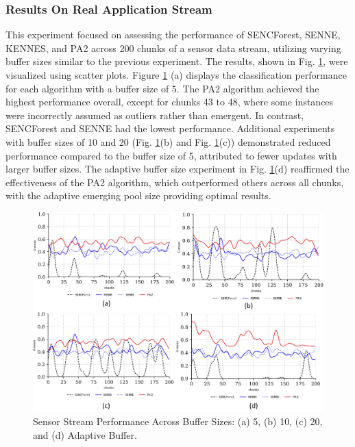 \subsubsection{Results On Real Application Stream}
\label{sec:sensor}
This experiment focused on assessing the performance of SENCForest, SENNE, KENNES, and PA2 across 200 chunks of a sensor data stream, utilizing varying buffer sizes similar to the previous experiment. The results, shown in Fig. \ref{fig:res2}, were visualized using scatter plots. Figure \ref{fig:res2} (a) displays the classification performance for each algorithm with a buffer size of 5. The PA2 algorithm achieved the highest performance overall, except for chunks 43 to 48, where some instances were incorrectly assumed as outliers rather than emergent. In contrast, SENCForest and SENNE had the lowest performance. Additional experiments with buffer sizes of 10 and 20 (Fig. \ref{fig:res2}(b) and Fig. \ref{fig:res2}(c)) demonstrated reduced performance compared to the buffer size of 5, attributed to fewer updates with larger buffer sizes. The adaptive buffer size experiment in Fig. \ref{fig:res2}(d) reaffirmed the effectiveness of the PA2 algorithm, which outperformed others across all chunks, with the adaptive emerging pool size providing optimal results.

\begin{figure}[!ht]
	\centering
	\includegraphics[width=1\linewidth]{5_Emerging/images/res2.png}
	\caption{Sensor Stream Performance Across Buffer Sizes: (a) 5, (b) 10, (c) 20, and (d) Adaptive Buffer.}

	\label{fig:res2}
\end{figure}				

